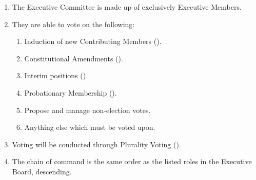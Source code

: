 
\begin{enumerate}
	\item The Executive Committee is made up of exclusively Executive Members.

	\item They are able to vote on the following:
		\begin{enumerate}
			\item Induction of new Contributing Members ().

			\item Constitutional Amendments ().

			\item Interim positions ().

			\item Probationary Membership ().

			\item Propose and manage non-election votes.

			\item Anything else which must be voted upon.
		\end{enumerate}

	\item Voting will be conducted through Plurality Voting ().

	\item The chain of command is the same order as the listed roles in the Executive
		Board, descending.
\end{enumerate}
